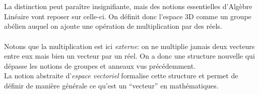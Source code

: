 \documentclass[oneside,12pt,french,table]{book}
\theoremstyle{definition}
\theoremstyle{definition}
\theoremstyle{definition}
\begin{document}
    \\ \\
    La distinction peut paraître insignifiante, mais des notions essentielles d'Algèbre Linéaire vont reposer sur celle-ci. On définit donc l'espace 3D comme un groupe abélien auquel on ajoute une opération de multiplication par des réels. \\ \\
    Notons que la multiplication est ici \textit{externe}: on ne multiplie jamais deux vecteurs entre eux mais bien un vecteur par un réel. On a donc une structure nouvelle qui dépasse les notions de groupes et anneaux vus précédemment. \\
    La notion abstraite d'\textit{espace vectoriel} formalise cette structure et permet de définir de manière générale ce qu'est un ``vecteur'' en mathématiques.
    
\end{document}
